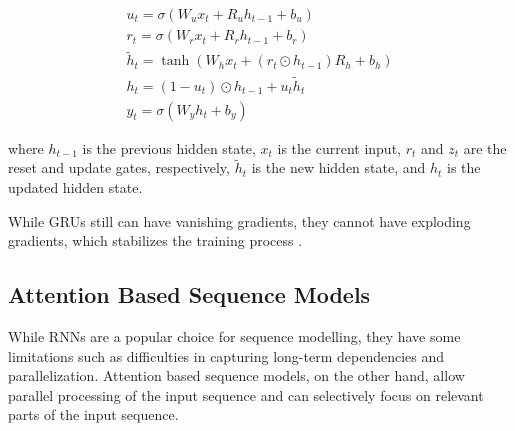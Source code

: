 \begin{align*}
    u_t = \sigma(W_u x_t + R_u h_{t-1} + b_u)\\
    r_t = \sigma(W_r x_t + R_r h_{t-1} + b_r)\\
    \tilde{h}_t = \tanh(W_h x_t + (r_t \odot h_{t-1})R_h + b_h)\\
    h_t = (1 - u_t) \odot h_{t-1} + u_t \tilde{h}_t\\
    y_t = \sigma(W_y h_t + b_y)
\end{align*}



where $h_{t-1}$ is the previous hidden state, $x_t$ is the current input, $r_t$ and $z_t$ are the reset and update gates, respectively, $\tilde{h}_t$ is the new hidden state, and $h_t$ is the updated hidden state.

While GRUs still can have vanishing gradients, they cannot have exploding gradients, which stabilizes the training process \cite{cahuantzi2023comparison}.


\subsection{Attention Based Sequence Models}

While RNNs are a popular choice for sequence modelling, they have some limitations such as difficulties in capturing long-term dependencies and parallelization.
Attention based sequence models, on the other hand, allow parallel processing of the input sequence and can selectively focus on relevant parts of the 
input sequence. \\

